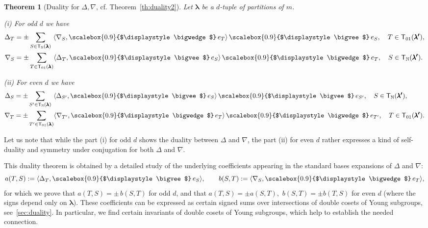 \documentclass[12pt, reqno]{amsart}
\newtheorem{theorem}{Theorem}[section]
\theoremstyle{definition}
\let\oldbigwedge\bigwedge
\let\oldbigvee\bigvee
\renewcommand{\bigwedge}{
  \mathop{
    \vcenter{
      \hbox{\scalebox{0.9}{$\displaystyle\oldbigwedge$}}
    }
  }
}
\renewcommand{\bigvee}{
  \mathop{
    \vcenter{
      \hbox{\scalebox{0.9}{$\displaystyle\oldbigvee$}}
    }
  }
}
\begin{document}
\begin{theorem}[Duality for $\Delta, \nabla$, cf. Theorem~\ref{th:duality2}]\label{th:intro3}
        Let $\pmb{\lambda}$ be a $d$-tuple of partitions of $m$.  
    
    (i) For odd $d$ we have 
    \begin{align*}
        \Delta_{T} &= \pm %
        \sum_{S \in \mathsf{T}_{\mathbb{N}}(\pmb{\lambda})}~
            \langle\nabla_S, \bigwedge e_T\rangle \bigvee e_S, \quad T \in  \mathsf{T}_{01}(\pmb{\lambda'}), %
            \\
        \nabla_{S} &= \pm %
        \sum_{T \in  \mathsf{T}_{01}(\pmb{\lambda})}
            \langle\Delta_T, \bigvee e_S\rangle \bigwedge e_T, \quad S \in \mathsf{T}_{\mathbb{N}}(\pmb{\lambda'}). %
    \end{align*}
    
    (ii) For even $d$  we have 
    \begin{align*}
        \Delta_{S} &=\pm \sum_{S' \in \mathsf{T}_{\mathbb{N}}(\pmb{\lambda})}~
            \langle
                \Delta_{S'}, 
                \bigvee e_{S}\rangle
            \bigvee e_{S'}, \quad S \in \mathsf{T}_{\mathbb{N}}(\pmb{\lambda'}),
            \\
        \nabla_{T} &=\pm \sum_{T' \in  \mathsf{T}_{01}(\pmb{\lambda})}
            \langle
                \nabla_{T'}, 
                \bigwedge e_T\rangle 
            \bigwedge e_{T'}, \quad T \in \mathsf{T}_{01}(\pmb{\lambda'}). %
    \end{align*}

\end{theorem}

Let us note that while the part (i) for odd $d$ shows the duality between $\Delta$ and $\nabla$, the part (ii) for even $d$ rather expresses a kind of self-duality and symmetry under conjugation for both $\Delta$ and $\nabla$. 

This duality theorem is obtained by a detailed study of the underlying coefficients appearing in the standard bases expansions of $\Delta$ and $\nabla$:
$$
    a(T, S) := \langle \Delta_T, \bigvee e_S \rangle, \qquad 
    b(S, T) := \langle \nabla_S, \bigwedge e_T \rangle,
$$
for which we prove that $a(T,S) = \pm\, b(S,T)$ for odd $d$, and that $a(T, S) = \pm a(S, T),$ $b(S, T) = \pm b(T, S)$ for even $d$ (where the signs depend only on $\pmb{\lambda}$). %
These coefficients can be expressed as certain signed sums over intersections of double cosets of Young subgroups, see \textsection\,\ref{sec:duality}. In particular, we find certain invariants of double cosets of Young subgroups, which help to establish the needed connection. 
\end{document}
